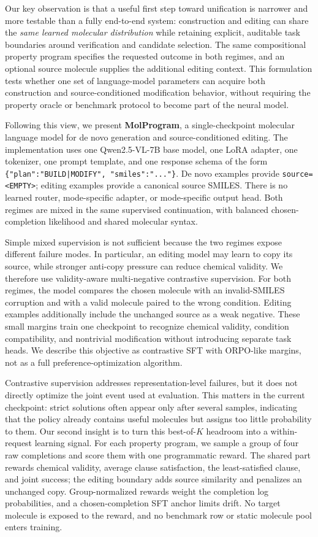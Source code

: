 \documentclass{article}
\begin{document}
Our key observation is that a useful first step toward unification is narrower
and more testable than a fully end-to-end system: construction and editing can
share the \emph{same learned molecular distribution} while retaining explicit,
auditable task boundaries around verification and candidate selection. The
same compositional property program specifies the requested outcome in both
regimes, and an optional source molecule supplies the additional editing
context. This formulation tests whether one set of language-model parameters
can acquire both construction and source-conditioned modification behavior,
without requiring the property oracle or benchmark protocol to become part of
the neural model.

Following this view, we present \textbf{MolProgram}, a single-checkpoint
molecular language model for de novo generation and source-conditioned editing.
The implementation uses one Qwen2.5-VL-7B base model, one LoRA adapter, one
tokenizer, one prompt template, and one response schema of the form
\texttt{\{"plan":"BUILD|MODIFY", "smiles":"..."\}}. De novo examples
provide \texttt{source=<EMPTY>}; editing examples provide a canonical source
SMILES. There is no learned router, mode-specific adapter, or mode-specific
output head. Both regimes are mixed in the same supervised continuation, with
balanced chosen-completion likelihood and shared molecular syntax.

Simple mixed supervision is not sufficient because the two regimes expose
different failure modes. In particular, an editing model may learn to copy its
source, while stronger anti-copy pressure can reduce chemical validity. We
therefore use validity-aware multi-negative contrastive supervision. For both
regimes, the model compares the chosen molecule with an invalid-SMILES
corruption and with a valid molecule paired to the wrong condition. Editing
examples additionally include the unchanged source as a weak negative. These
small margins train one checkpoint to recognize chemical validity, condition
compatibility, and nontrivial modification without introducing separate task
heads. We describe this objective as contrastive SFT with ORPO-like margins,
not as a full preference-optimization algorithm.

Contrastive supervision addresses representation-level failures, but it does
not directly optimize the joint event used at evaluation. This matters in the
current checkpoint: strict solutions often appear only after several samples,
indicating that the policy already contains useful molecules but assigns too
little probability to them. Our second insight is to turn this best-of-$K$
headroom into a within-request learning signal. For each property program, we
sample a group of four raw completions and score them with one programmatic
reward. The shared part rewards chemical validity, average clause satisfaction,
the least-satisfied clause, and joint success; the editing boundary adds source
similarity and penalizes an unchanged copy. Group-normalized rewards weight the
completion log probabilities, and a chosen-completion SFT anchor limits drift.
No target molecule is exposed to the reward, and no benchmark row or static
molecule pool enters training.
\end{document}
